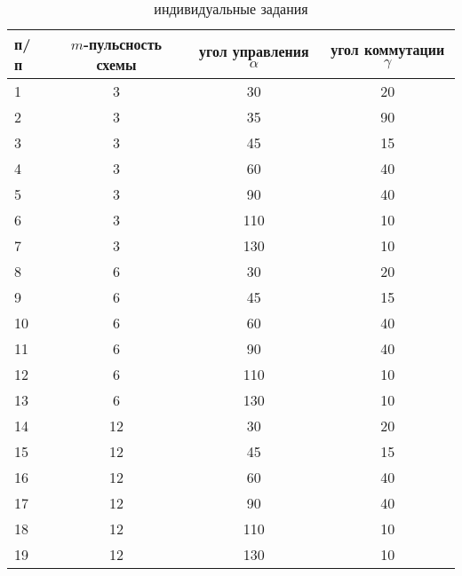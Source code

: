 \documentclass{article}
\begin{document}
\begin{table}[ht!]
\centering
\begin{tabular}{l|c|c|c}
\toprule
	\textnumero п/п&	$m$-пульсность схемы & угол управления $\alpha$ & угол коммутации $\gamma$ \\
\midrule
	1&	3 & 30 & 20\\ 
	2&	3 & 35 & 90\\ 
	3&	3 & 45 & 15\\ 
	4&	3 & 60 & 40\\ 
	5&	3 & 90 & 40\\ 
	6&	3 & 110 & 10\\ 
	7&	3 & 130 & 10\\ 
        8&      6 & 30 & 20\\
        9&      6 & 45 & 15\\
        10&      6 & 60 & 40\\
        11&      6 & 90 & 40\\
        12&      6 & 110 & 10\\
        13&      6 & 130 & 10\\
        14&      12 & 30 & 20\\
        15&      12 & 45 & 15\\
        16&      12 & 60 & 40\\
        17&      12 & 90 & 40\\
        18&      12 & 110 & 10\\
        19&      12 & 130 & 10\\
\bottomrule
\end{tabular}
	\caption{индивидуальные задания}
\end{table}
\end{document}
